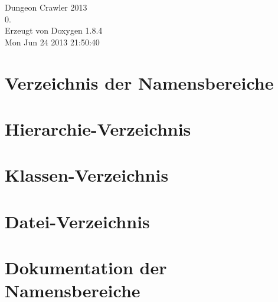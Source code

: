 \documentclass[twoside]{book}
\newcommand{\clearemptydoublepage}{%
  \newpage{\pagestyle{empty}\cleardoublepage}%
}
\begin{document}
\hypersetup{pageanchor=false}
\begin{titlepage}
\vspace*{7cm}
\begin{center}%
{\Large Dungeon Crawler 2013 \\[1ex]\large 0. }\\
\vspace*{1cm}
{\large Erzeugt von Doxygen 1.8.4}\\
\vspace*{0.5cm}
{\small Mon Jun 24 2013 21:50:40}\\
\end{center}
\end{titlepage}
\clearemptydoublepage
\tableofcontents
\clearemptydoublepage
{}
\hypersetup{pageanchor=true}

\chapter{Verzeichnis der Namensbereiche}

\chapter{Hierarchie-\/\-Verzeichnis}

\chapter{Klassen-\/\-Verzeichnis}

\chapter{Datei-\/\-Verzeichnis}

\chapter{Dokumentation der Namensbereiche}




\end{document}
